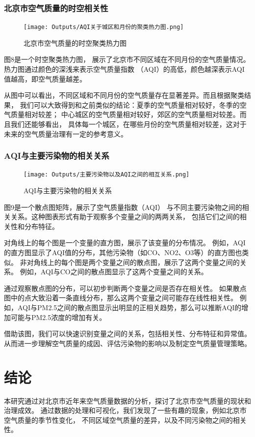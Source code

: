 \documentclass[12pt, a4paper, oneside]{ctexart}
\begin{document}
\subsubsection{北京市空气质量的时空相关性}
\begin{figure}[ht]
    \centering
    \texttt{[image: Outputs/AQI关于城区和月份的聚类热力图.png]}
    \caption{北京市空气质量的时空聚类热力图}
    \label{fig:air_quality_correlation}
\end{figure}
图8是一个时空聚类热力图，
展示了北京市不同区域在不同月份的空气质量情况。热力图通过颜色的深浅来表示空气质量指数
（AQI）的高低，颜色越深表示AQI值越高，即空气质量越差。

从图中可以看出，不同区域和不同月份的空气质量存在显著差异。而且根据聚类结果，
我们可以大致得到和之前类似的结论：夏季的空气质量相对较好，冬季的空气质量相对较差；
中心城区的空气质量相对较好，郊区的空气质量相对较差。而且我们还能够看出，
具体每一个城区，在哪些月份的空气质量相对较差，这对于未来的空气质量治理有一定的参考意义。

\subsubsection{AQI与主要污染物的相关关系}
\begin{figure}[ht]
    \centering
    \texttt{[image: Outputs/主要污染物以及AQI之间的相互关系.png]}
    \caption{AQI与主要污染物的相关关系}
    \label{fig:air_quality_pollutants}
\end{figure}
图9是一个散点图矩阵，展示了空气质量指数（AQI）
与不同主要污染物之间的相关关系。这种图表形式有助于观察多个变量之间的两两关系，
包括它们之间的相关性和分布特征。

对角线上的每个图是一个变量的直方图，展示了该变量的分布情况。
例如，AQI的直方图显示了AQI值的分布，其他污染物（如CO、NO2、O3等）的直方图也类似。
非对角线上的每个图是两个变量之间的散点图，展示了这两个变量之间的关系。
例如，AQI与CO之间的散点图显示了这两个变量之间的关系。

通过观察散点图的分布，可以初步判断两个变量之间是否存在相关性。
如果散点图中的点大致沿着一条直线分布，那么这两个变量之间可能存在线性相关性。
例如，AQI与PM2.5之间的散点图显示出明显的正相关趋势，那么可以推断AQI的增加可能与PM2.5浓度的增加有关。

借助该图，我们可以快速识别变量之间的关系，包括相关性、分布特征和异常值。
从而进一步理解空气质量的成因、评估污染物的影响以及制定空气质量管理策略。
\FloatBarrier
\newpage
\section{结论}
本研究通过对北京市近年来空气质量数据的分析，探讨了北京市空气质量的现状和治理成效。
通过数据的处理和可视化，我们发现了一些有趣的现象，例如北京市空气质量的季节性变化，
不同区域空气质量的差异，以及不同污染物之间的相关性。
\end{document}
